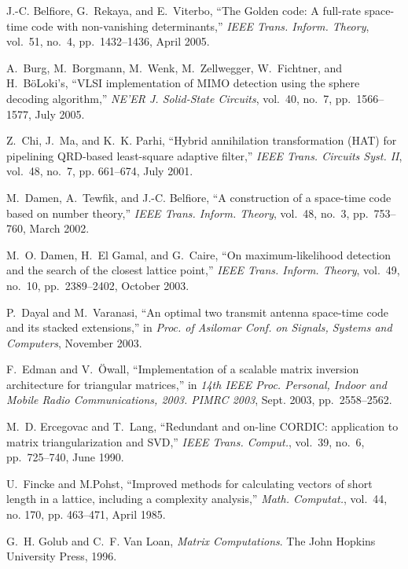 \documentclass[12pt,onecolumn,draftclsnofoot]{IEEEtran}
\begin{document}
\begin{thebibliography}{10}

J.-C. Belfiore, G.~Rekaya, and E.~Viterbo, ``The Golden code: A
 full-rate space-time code with non-vanishing
determinants,'' \emph{{IEEE} Trans. Inform. Theory}, vol.~51, no.~4,
pp.~1432--1436, April 2005.

A.~Burg, M.~Borgmann, M.~Wenk, M.~Zellwegger, W.~Fichtner, and
H.~B{\"o}Loki's, ``{VLSI} implementation of {MIMO} detection using
the sphere decoding   algorithm,'' \emph{{NE'ER} J. Solid-State
Circuits}, vol.~40, no.~7, pp.~1566--1577, July 2005.

Z.~Chi, J.~Ma, and K.~K. Parhi, ``Hybrid annihilation transformation
{(HAT)}  for pipelining {QRD}-based least-square adaptive filter,''
\emph{{IEEE}  Trans. Circuits Syst. {II}}, vol.~48, no.~7, pp.
661--674, July 2001.

M.~Damen, A.~Tewfik, and J.-C. Belfiore, ``A construction of a
space-time code based on number theory,'' \emph{{IEEE} Trans.
Inform. Theory}, vol.~48, no.~3, pp.~753--760, March 2002.

M.~O. Damen, H.~{El Gamal}, and G.~Caire, ``On maximum-likelihood
detection and  the search of the closest lattice point,''
\emph{{IEEE} Trans. Inform. Theory}, vol.~49, no.~10,
pp.~2389--2402, October 2003.

P.~Dayal and M.~Varanasi, ``An optimal two transmit antenna
space-time code and   its stacked extensions,'' in \emph{Proc. of
Asilomar Conf. on Signals, Systems and Computers}, November 2003.

F.~Edman and V.~{\"O}wall, ``Implementation of a scalable matrix
inversion architecture for triangular matrices,'' in \emph{14th IEEE
Proc. Personal, Indoor and Mobile Radio Communications, 2003. PIMRC
2003}, Sept. 2003, pp.~2558--2562.

M.~D. Ercegovac and T.~Lang, ``Redundant and on-line {CORDIC}:
application to  matrix triangularization and {SVD},'' \emph{{IEEE}
Trans. Comput.}, vol.~39, no.~6, pp.~725--740, June 1990.

U.~Fincke and M.Pohst, ``Improved methods for calculating vectors of
short length in a lattice, including a complexity analysis,''
\emph{Math. Computat.}, vol.~44, no. 170, pp. 463--471, April 1985.

G.~H. Golub and C.~F. {Van Loan}, \emph{Matrix Computations}.
 The John Hopkins University Press, 1996.


\end{thebibliography}
\end{document}

